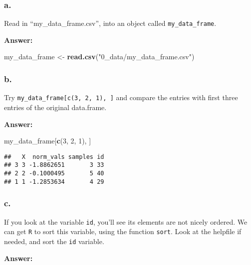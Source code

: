 \documentclass[]{article}
\newenvironment{Shaded}{\begin{snugshade}}{\end{snugshade}}
\newcommand{\DecValTok}[1]{\textcolor[rgb]{0.00,0.00,0.81}{#1}}
\newcommand{\KeywordTok}[1]{\textcolor[rgb]{0.13,0.29,0.53}{\textbf{#1}}}
\newcommand{\NormalTok}[1]{#1}
\newcommand{\OperatorTok}[1]{\textcolor[rgb]{0.81,0.36,0.00}{\textbf{#1}}}
\newcommand{\StringTok}[1]{\textcolor[rgb]{0.31,0.60,0.02}{#1}}
\begin{document}
\hypertarget{a.-6}{%
\subsubsection{a.}\label{a.-6}}

Read in ``my\_data\_frame.csv'', into an object called
\texttt{my\_data\_frame}.

\textbf{Answer:}

\begin{Shaded}
\begin{Highlighting}[]
\NormalTok{my_data_frame <-}\StringTok{ }\KeywordTok{read.csv}\NormalTok{(}\StringTok{"0_data/my_data_frame.csv"}\NormalTok{)}
\end{Highlighting}
\end{Shaded}

\hypertarget{b.-6}{%
\subsubsection{b.}\label{b.-6}}

Try \texttt{my\_data\_frame{[}c(3,\ 2,\ 1),\ {]}} and compare the
entries with first three entries of the original data.frame.

\textbf{Answer:}

\begin{Shaded}
\begin{Highlighting}[]
\NormalTok{my_data_frame[}\KeywordTok{c}\NormalTok{(}\DecValTok{3}\NormalTok{, }\DecValTok{2}\NormalTok{, }\DecValTok{1}\NormalTok{), ]}
\end{Highlighting}
\end{Shaded}

\begin{verbatim}
##   X  norm_vals samples id
## 3 3 -1.8862651       3 33
## 2 2 -0.1000495       5 40
## 1 1 -1.2853634       4 29
\end{verbatim}

\hypertarget{c.-6}{%
\subsubsection{c.}\label{c.-6}}

If you look at the variable \texttt{id}, you'll see its elements are not
nicely ordered. We can get \texttt{R} to sort this variable, using the
function \texttt{sort}. Look at the helpfile if needed, and sort the
\texttt{id} variable.

\textbf{Answer:}

\begin{Shaded}
\end{Shaded}
\end{document}
